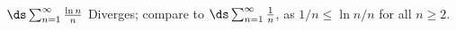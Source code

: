{$\ds \sum_{n=1}^\infty \frac{\ln n}{n}$
}
{Diverges; compare to $\ds \sum_{n=1}^\infty \frac{1}{n}$, as $1/n \leq \ln n/n$ for all $n\geq 2$. 
}